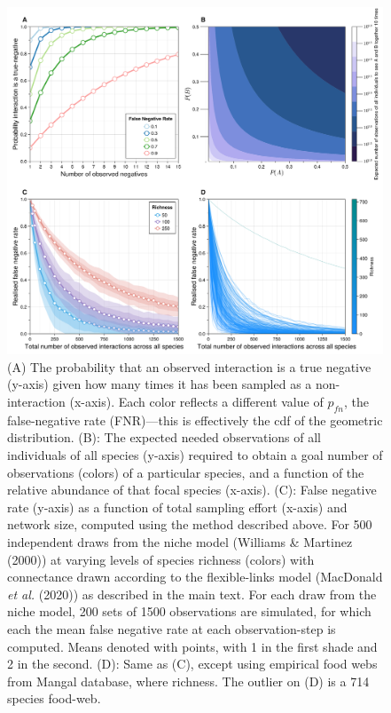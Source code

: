 \documentclass[10pt,oneside]{article}
\makeatletter
\def\maxwidth{\ifdim\Gin@nat@width>\linewidth\linewidth
\else\Gin@nat@width\fi}
\let\Oldincludegraphics\includegraphics
\renewcommand{\includegraphics}[1]{\Oldincludegraphics[width=\maxwidth]{#1}}
\makeatother
\begin{document}
\begin{figure}
\hypertarget{fig:geometric}{%
\centering
\includegraphics{./figures/fig1.png}
\caption{(A) The probability that an observed interaction is a true
negative (y-axis) given how many times it has been sampled as a
non-interaction (x-axis). Each color reflects a different value of
\(p_{fn}\), the false-negative rate (FNR)---this is effectively the cdf
of the geometric distribution. (B): The expected needed observations of
all individuals of all species (y-axis) required to obtain a goal number
of observations (colors) of a particular species, and a function of the
relative abundance of that focal species (x-axis). (C): False negative
rate (y-axis) as a function of total sampling effort (x-axis) and
network size, computed using the method described above. For 500
independent draws from the niche model (Williams \& Martinez (2000)) at
varying levels of species richness (colors) with connectance drawn
according to the flexible-links model (MacDonald \emph{et al.} (2020))
as described in the main text. For each draw from the niche model, 200
sets of 1500 observations are simulated, for which each the mean false
negative rate at each observation-step is computed. Means denoted with
points, with 1 in the first shade and 2 in the second. (D): Same as (C),
except using empirical food webs from Mangal database, where richness.
The outlier on (D) is a 714 species food-web.}\label{fig:geometric}
}
\end{figure}
\end{document}

